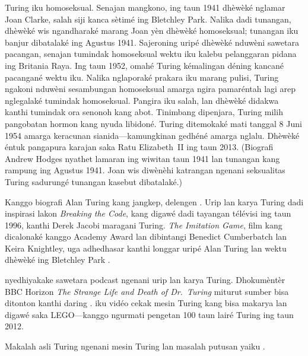 \documentclass[../../../include/open-logic-section]{subfiles}
\begin{document}
Turing iku homoseksual.
Senajan mangkono, ing
taun 1941 dhèwèké
nglamar Joan Clarke,
salah siji kanca
sètimé ing Bletchley
Park. Nalika dadi tunangan,
dhèwèké wis ngandharaké marang
Joan yèn dhèwèké homoseksual;
tunangan iku banjur dibatalaké
ing Agustus 1941. Sajeroning
uripé dhèwèké
nduwèni sawetara
pacangan, senajan
tumindak homoseksual
wektu iku kalebu
pelanggaran pidana
ing Britania Raya.
Ing taun 1952,
omahé Turing
kémalingan déning
kancané pacangané
wektu iku. Nalika
nglaporaké prakara
iku marang pulisi,
Turing ngakoni
nduwèni sesambungan
homoseksual amarga
ngira pamaréntah
lagi arep nglegalaké
tumindak homoseksual.
Pangira iku salah,
lan dhèwèké didakwa
kanthi tumindak
ora senonoh kang
abot. Tinimbang
dipenjara, Turing
milih pangobatan
hormon kang nyuda
libidoné. Turing
ditemokaké mati
tanggal 8 Juni 1954
amarga keracunan
sianida---kamungkinan
gedhéné amarga nglalu.
Dhèwèké éntuk
pangapura karajan
saka Ratu
Elizabeth~II
ing taun 2013.
(Biografi Andrew Hodges nyathet lamaran ing wiwitan taun 1941 lan tunangan kang rampung ing Agustus 1941. Joan wis diwènèhi katrangan ngenani seksualitas Turing sadurungé tunangan kasebut dibatalaké.)

\begin{reading}
Kanggo biografi Alan Turing
kang jangkep, delengen
\citet{Hodges2014}.
Urip lan karya Turing
dadi inspirasi lakon
\emph{Breaking the Code},
kang digawé dadi
tayangan télévisi
ing taun 1996,
kanthi Derek Jacobi
maragani Turing.
\emph{The Imitation Game},
film kang dicalonaké
kanggo Academy Award
lan dibintangi
Benedict Cumberbatch
lan Keira Knightley,
uga adhedhasar
kanthi longgar
uripé Alan Turing
lan wektu dhèwèké
ing Bletchley Park
\citep{Imitation2014}.

\citet{Radiolab2012}
nyedhiyakake
sawetara podcast
ngenani urip
lan karya Turing.
Dhokumèntèr
BBC Horizon
\emph{The Strange Life and Death of
  Dr.~Turing}
miturut sumber bisa ditonton
kanthi daring
\citep{Sykes1992}.
\citep{Theelen2012}
iku vidéo cekak
mesin Turing
kang bisa makarya
lan digawé saka
LEGO---kanggo
ngurmati
pengetan 100
taun lairé
Turing ing
taun 2012.

Makalah asli
Turing ngenani
mesin Turing
lan masalah
putusan yaiku
\citet{Turing1937}.
\end{reading}
\end{document}
